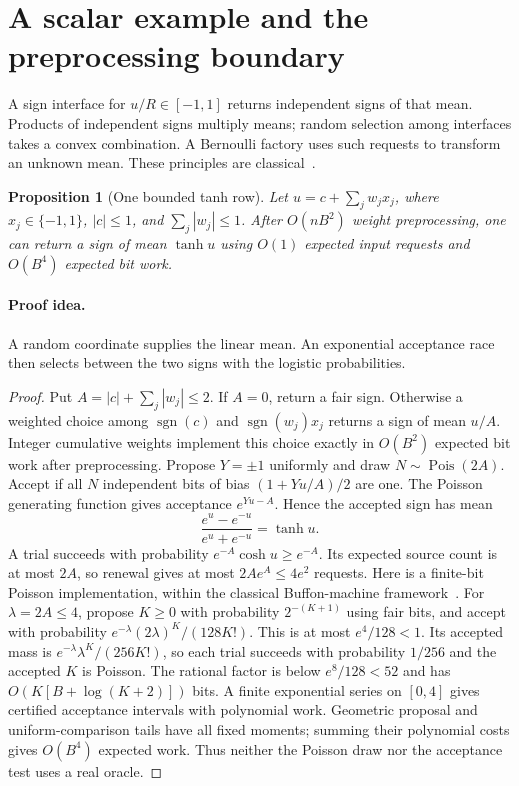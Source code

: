 \documentclass[11pt]{article}
\newtheorem{proposition}[theorem]{Proposition}
\theoremstyle{definition}\newtheorem{definition}[theorem]{Definition}
\theoremstyle{remark}\newtheorem{remark}[theorem]{Remark}
\newcommand{\sgn}{\operatorname{sgn}}\newcommand{\poly}{\operatorname{poly}}\newcommand{\Bern}{\operatorname{Bern}}
\newcommand{\Pois}{\operatorname{Pois}}\newcommand{\sech}{\operatorname{sech}}
\numberwithin{equation}{section}
\begin{document}


\section{A scalar example and the preprocessing boundary}
\label{sec:conf-scalar}

A sign interface for $u/R\in[-1,1]$ returns independent signs of that
mean. Products of independent signs multiply means; random selection
among interfaces takes a convex combination. A Bernoulli factory uses
such requests to transform an unknown mean. These principles are
classical~\cite{gaines1967,nacuperes2005,holtz2011,dughmi2017}.

\begin{proposition}[One bounded tanh row]
\label{prop:conf-row}
Let $u=c+\sum_jw_jx_j$, where $x_j\in\{-1,1\}$, $|c|\le1$,
and $\sum_j|w_j|\le1$. After $O(nB^2)$ weight preprocessing, one can
return a sign of mean $\tanh u$ using $O(1)$ expected input requests
and $O(B^4)$ expected bit work.
\end{proposition}
\paragraph{Proof idea.}
A random coordinate supplies the linear mean. An exponential acceptance
race then selects between the two signs with the logistic probabilities.
\begin{proof}
Put $A=|c|+\sum_j|w_j|\le2$. If $A=0$, return a fair sign.
Otherwise a weighted choice among $\sgn(c)$ and $\sgn(w_j)x_j$
returns a sign of mean $u/A$. Integer cumulative weights implement this
choice exactly in $O(B^2)$ expected bit work after preprocessing.
Propose $Y=\pm1$ uniformly and draw $N\sim\Pois(2A)$. Accept if all
$N$ independent bits of bias $(1+Yu/A)/2$ are one. The Poisson generating
function gives acceptance $e^{Yu-A}$. Hence the accepted sign has mean
\[
 \frac{e^u-e^{-u}}{e^u+e^{-u}}=\tanh u.
\]
A trial succeeds with probability $e^{-A}\cosh u\ge e^{-A}$.
Its expected source count is at most $2A$, so renewal gives at most
$2Ae^A\le4e^2$ requests. Here is a finite-bit Poisson implementation, within the classical
Buffon-machine framework~\cite{flajolet2011buffon}. For $\lambda=2A\le4$,
propose $K\ge0$ with probability $2^{-(K+1)}$ using fair bits, and accept
with probability $e^{-\lambda}(2\lambda)^K/(128K!)$. This is at most
$e^4/128<1$. Its accepted mass is
$e^{-\lambda}\lambda^K/(256K!)$, so each trial succeeds with probability
$1/256$ and the accepted $K$ is Poisson. The rational factor is below
$e^8/128<52$ and has $O(K[B+\log(K+2)])$ bits. A finite exponential
series on $[0,4]$ gives certified acceptance intervals with polynomial
work. Geometric proposal and uniform-comparison tails have all fixed
moments; summing their polynomial costs gives $O(B^4)$ expected work.
Thus neither the Poisson draw nor the acceptance test uses a real oracle.
\end{proof}
\end{document}
